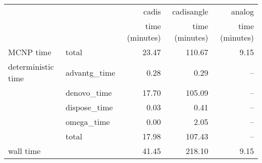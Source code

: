 \begin{tabular}{llrrr}
\toprule
          &              &          cadis &     cadisangle &         analog \\
          &              & time (minutes) & time (minutes) & time (minutes) \\
\midrule
MCNP time & total &          23.47 &         110.67 &           9.15 \\
deterministic time & advantg\_time &           0.28 &           0.29 &            -- \\
          & denovo\_time &          17.70 &         105.09 &            -- \\
          & dispose\_time &           0.03 &           0.41 &            -- \\
          & omega\_time &           0.00 &           2.05 &            -- \\
          & total &          17.98 &         107.43 &            -- \\
wall time &              &          41.45 &         218.10 &           9.15 \\
\bottomrule
\end{tabular}
